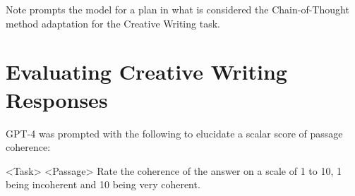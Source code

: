 \documentclass[11pt]{article}
\begin{document}
Note \citealp{yao_tree_2023} prompts the model for a plan in what is considered the Chain-of-Thought method adaptation for the Creative Writing task.

\section{Evaluating Creative Writing Responses}

GPT-4 was prompted with the following to elucidate a scalar score of passage coherence:

<Task>
<Passage>
Rate the coherence of the answer on a scale of 1 to 10, 1 being incoherent and 10 being very coherent.
\end{document}
